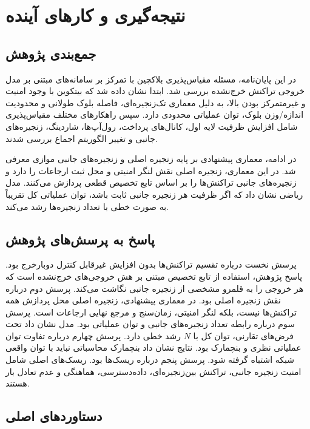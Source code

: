 \chapter{نتیجه‌گیری و کارهای آینده}
\section{جمع‌بندی پژوهش}

در این پایان‌نامه، مسئله مقیاس‌پذیری بلاکچین با تمرکز بر سامانه‌های مبتنی بر مدل خروجی تراکنش خرج‌نشده بررسی شد. ابتدا نشان داده شد که بیتکوین با وجود امنیت و غیرمتمرکز بودن بالا، به دلیل معماری تک‌زنجیره‌ای، فاصله بلوک طولانی و محدودیت اندازه/وزن بلوک، توان عملیاتی محدودی دارد. سپس راهکارهای مختلف مقیاس‌پذیری شامل افزایش ظرفیت لایه اول، کانال‌های پرداخت، رول‌آپ‌ها، شاردینگ، زنجیره‌های جانبی و تغییر الگوریتم اجماع بررسی شدند.

در ادامه، معماری پیشنهادی بر پایه زنجیره اصلی و زنجیره‌های جانبی موازی معرفی شد. در این معماری، زنجیره اصلی نقش لنگر امنیتی و محل ثبت ارجاعات را دارد و زنجیره‌های جانبی تراکنش‌ها را بر اساس تابع تخصیص قطعی پردازش می‌کنند. مدل ریاضی نشان داد که اگر ظرفیت هر زنجیره جانبی ثابت باشد، توان عملیاتی کل تقریباً به صورت خطی با تعداد زنجیره‌ها رشد می‌کند.

\section{پاسخ به پرسش‌های پژوهش}

پرسش نخست درباره تقسیم تراکنش‌ها بدون افزایش غیرقابل کنترل دوبارخرج بود. پاسخ پژوهش، استفاده از تابع تخصیص مبتنی بر هش خروجی‌های خرج‌نشده است که هر خروجی را به قلمرو مشخصی از زنجیره جانبی نگاشت می‌کند. پرسش دوم درباره نقش زنجیره اصلی بود. در معماری پیشنهادی، زنجیره اصلی محل پردازش همه تراکنش‌ها نیست، بلکه لنگر امنیتی، زمان‌سنج و مرجع نهایی ارجاعات است. پرسش سوم درباره رابطه تعداد زنجیره‌های جانبی و توان عملیاتی بود. مدل نشان داد تحت فرض‌های تقارنی، توان کل با \(N\) رشد خطی دارد. پرسش چهارم درباره تفاوت توان عملیاتی نظری و بنچمارک بود. نتایج نشان داد بنچمارک محاسباتی نباید با توان واقعی شبکه اشتباه گرفته شود. پرسش پنجم درباره ریسک‌ها بود. ریسک‌های اصلی شامل امنیت زنجیره جانبی، تراکنش بین‌زنجیره‌ای، داده‌دسترسی، هماهنگی و عدم تعادل بار هستند.

\section{دستاوردهای اصلی}

